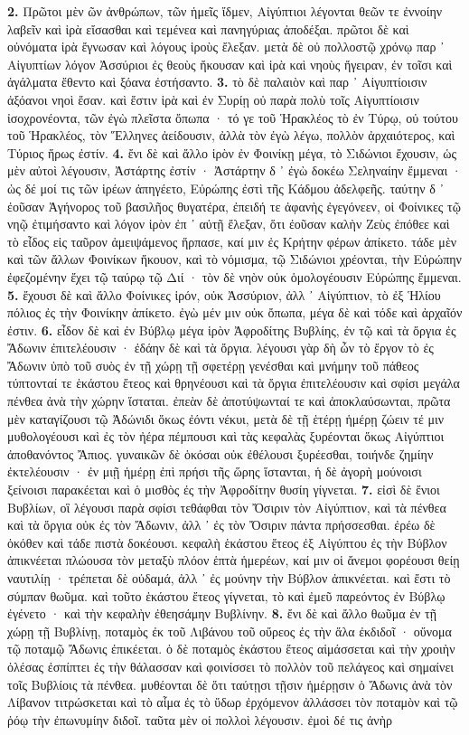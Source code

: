 \documentclass[a4paper, 11pt, oneside, polutonikogreek, german]{article}
\begin{document}
\textbf{2.} Πρῶτοι μὲν ῶν ἀνθρώπων, τῶν ἡμεῖς ἴδμεν, Αἰγύπτιοι λέγονται θεῶν τε ἐννοίην λαβεῖν καὶ ἱρὰ εἴσασθαι καὶ τεμένεα καὶ πανηγύριας ἀποδέξαι. πρῶτοι δὲ καὶ οὐνόματα ἱρὰ ἔγνωσαν καὶ λόγους ἱροὺς ἔλεξαν. μετὰ δὲ οὐ πολλοστῷ χρόνῳ παρ ᾽ Αἰγυπτίων λόγον Ἀσσύριοι ἐς θεοὺς ἤκουσαν καὶ ἱρὰ καὶ νηοὺς ἤγειραν, ἐν τοῖσι καὶ ἀγάλματα ἔθεντο καὶ ξόανα ἐστήσαντο. \textbf{3.} τὸ δὲ παλαιὸν καὶ παρ ᾽ Αἰγυπτίοισιν ἀξόανοι νηοὶ ἔσαν. καὶ ἔστιν ἱρὰ καὶ ἐν Συρίῃ οὐ παρὰ πολὺ τοῖς Αἰγυπτίοισιν ἰσοχρονέοντα, τῶν ἐγὼ πλεῖστα ὄπωπα · τό γε τοῦ Ἡρακλέος τὸ ἐν Τύρῳ, οὐ τούτου τοῦ Ἡρακλέος, τὸν Ἕλληνες ἀείδουσιν, ἀλλὰ τὸν ἐγὼ λέγω, πολλὸν ἀρχαιότερος, καὶ Τύριος ἥρως ἐστίν. \textbf{4.} ἔνι δὲ καὶ ἄλλο ἱρὸν ἐν Φοινίκῃ μέγα, τὸ Σιδώνιοι ἔχουσιν, ὡς μὲν αὐτοὶ λέγουσιν, Ἀστάρτης ἐστίν · Ἀστάρτην δ ᾽ ἐγὼ δοκέω Σεληναίην ἔμμεναι · ὡς δέ μοί τις τῶν ἱρέων ἀπηγέετο, Εὐρώπης ἐστὶ τῆς Κάδμου ἀδελφεῆς. ταύτην δ ᾽ ἐοῦσαν Ἀγήνορος τοῦ βασιλῆος θυγατέρα, ἐπειδή τε ἀφανὴς ἐγεγόνεεν, οἱ Φοίνικες τῷ νηῷ ἐτιμήσαντο καὶ λόγον ἱρὸν ἐπ ᾽ αὐτῇ ἔλεξαν, ὅτι ἐοῦσαν καλὴν Ζεὺς ἐπόθεε καὶ τὸ εἶδος εἰς ταῦρον ἀμειψάμενος ἥρπασε, καί μιν ἐς Κρήτην φέρων ἀπίκετο. τάδε μὲν καὶ τῶν ἄλλων Φοινίκων ἤκουον, καὶ τὸ νόμισμα, τῷ Σιδώνιοι χρέονται, τὴν Εὐρώπην ἐφεζομένην ἔχει τῷ ταύρῳ τῷ Διί · τὸν δὲ νηὸν οὐκ ὁμολογέουσιν Εὐρώπης ἔμμεναι. \textbf{5.} ἔχουσι δὲ καὶ ἄλλο Φοίνικες ἱρόν, οὐκ Ἀσσύριον, ἀλλ ᾽ Αἰγύπτιον, τὸ ἐξ Ἡλίου πόλιος ἐς τὴν Φοινίκην ἀπίκετο. ἐγὼ μέν μιν οὐκ ὄπωπα, μέγα δὲ καὶ τόδε καὶ ἀρχαῖόν ἐστιν. \textbf{6.} εἶδον δὲ καὶ ἐν Βύβλῳ μέγα ἱρὸν Ἀφροδίτης Βυβλίης, ἐν τῷ καὶ τὰ ὄργια ἐς Ἄδωνιν ἐπιτελέουσιν · ἐδάην δὲ καὶ τὰ ὄργια. λέγουσι γὰρ δὴ ὦν τὸ ἔργον τὸ ἐς Ἄδωνιν ὑπὸ τοῦ συὸς ἐν τῇ χώρῃ τῇ σφετέρῃ γενέσθαι καὶ μνήμην τοῦ πάθεος τύπτονταί τε ἑκάστου ἔτεος καὶ θρηνέουσι καὶ τὰ ὄργια ἐπιτελέουσιν καὶ σφίσι μεγάλα πένθεα ἀνὰ τὴν χώρην ἵσταται. ἐπεὰν δὲ ἀποτύψωνταί τε καὶ ἀποκλαύσωνται, πρῶτα μὲν καταγίζουσι τῷ Ἀδώνιδι ὅκως ἐόντι νέκυι, μετὰ δὲ τῇ ἑτέρῃ ἡμέρῃ ζώειν τέ μιν μυθολογέουσι καὶ ἐς τὸν ἠέρα πέμπουσι καὶ τὰς κεφαλὰς ξυρέονται ὅκως Αἰγύπτιοι ἀποθανόντος Ἄπιος. γυναικῶν δὲ ὁκόσαι οὐκ ἐθέλουσι ξυρέεσθαι, τοιήνδε ζημίην ἐκτελέουσιν · ἐν μιῇ ἡμέρῃ ἐπὶ πρήσι τῆς ὥρης ἵστανται, ἡ δὲ ἀγορὴ μούνοισι ξείνοισι παρακέεται καὶ ὁ μισθὸς ἐς τὴν Ἀφροδίτην θυσίη γίγνεται. \textbf{7.} εἰσὶ δὲ ἔνιοι Βυβλίων, οἳ λέγουσι παρὰ σφίσι τεθάφθαι τὸν Ὄσιριν τὸν Αἰγύπτιον, καὶ τὰ πένθεα καὶ τὰ ὄργια οὐκ ἐς τὸν Ἄδωνιν, ἀλλ ᾽ ἐς τὸν Ὄσιριν πάντα πρήσσεσθαι. ἐρέω δὲ ὁκόθεν καὶ τάδε πιστὰ δοκέουσι. κεφαλὴ ἑκάστου ἔτεος ἐξ Αἰγύπτου ἐς τὴν Βύβλον ἀπικνέεται πλώουσα τὸν μεταξὺ πλόον ἑπτὰ ἡμερέων, καί μιν οἱ ἄνεμοι φορέουσι θείῃ ναυτιλίῃ · τρέπεται δὲ οὐδαμά, ἀλλ ᾽ ἐς μούνην τὴν Βύβλον ἀπικνέεται. καὶ ἔστι τὸ σύμπαν θωῦμα. καὶ τοῦτο ἑκάστου ἔτεος γίγνεται, τὸ καὶ ἐμεῦ παρεόντος ἐν Βύβλῳ ἐγένετο · καὶ τὴν κεφαλὴν ἐθεησάμην Βυβλίνην. \textbf{8.} ἔνι δὲ καὶ ἄλλο θωῦμα ἐν τῇ χώρῃ τῇ Βυβλίνῃ, ποταμὸς ἐκ τοῦ Λιβάνου τοῦ οὔρεος ἐς τὴν ἅλα ἐκδιδοῖ · οὔνομα τῷ ποταμῷ Ἄδωνις ἐπικέεται. ὁ δὲ ποταμὸς ἑκάστου ἔτεος αἱμάσσεται καὶ τὴν χροιὴν ὀλέσας ἐσπίπτει ἐς τὴν θάλασσαν καὶ φοινίσσει τὸ πολλὸν τοῦ πελάγεος καὶ σημαίνει τοῖς Βυβλίοις τὰ πένθεα. μυθέονται δὲ ὅτι ταύτῃσι τῇσιν ἡμέρῃσιν ὁ Ἄδωνις ἀνὰ τὸν Λίβανον τιτρώσκεται καὶ τὸ αἷμα ἐς τὸ ὕδωρ ἐρχόμενον ἀλλάσσει τὸν ποταμὸν καὶ τῷ ῥόῳ τὴν ἐπωνυμίην διδοῖ. ταῦτα μὲν οἱ πολλοὶ λέγουσιν. ἐμοὶ δέ τις ἀνὴρ 
\end{document}
